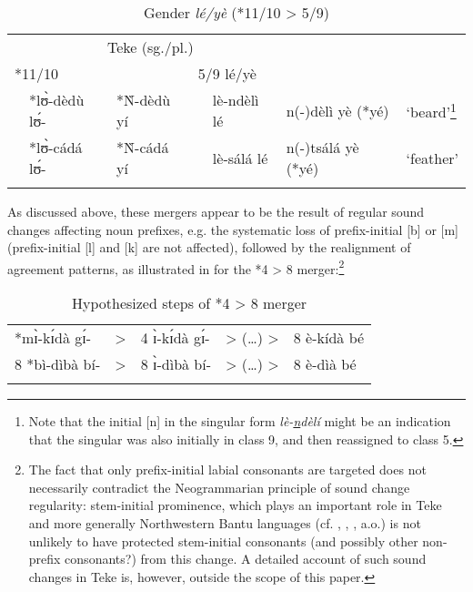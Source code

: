 \documentclass[output=paper,,modfonts,nonflat]{langsci/langscibook}
\begin{document}
\begin{table}[H]
\caption{Gender \textit{lé/yè} (*11/10 > 5/9)}
\label{table8}
\begin{small}
\begin{tabular}{l		l l l  		l		l		l}
  \lsptoprule
\multicolumn{3}{c}{PB (sg./pl.)}					&	\multicolumn{4}{c}{Teke (sg./pl.)}	\\	
\cmidrule(r){1-3}\cmidrule(l){4-7}
\multicolumn{2}{l}{*11/10}			&		&	\multicolumn{2}{l}{5/9 lé/yè}			&		&		\\	
	&	*lʊ̀-dèdù lʊ́-	&	*Ǹ-dèdù yí	&		&	lè-ndèlì lé	&	n(-)dèlì yè (*yé)	&	`beard’\footnote{Note that the initial [n] in the singular form \emph{lè-\underline{n}dèlí} might be an indication that the singular was also initially in class 9, and then reassigned to class 5.}	\\	
	&	*lʊ̀-cádá lʊ́-	&	*Ǹ-cádá yí	&		&	lè-sálá lé	&	n(-)tsálá yè (*yé)	&	`feather’	\\  
  \lspbottomrule
\end{tabular}
\end{small}
\end{table}
As discussed above, these mergers appear to be the result of regular sound changes affecting noun prefixes, e.g. the systematic loss of prefix-initial [b] or [m] (prefix-initial [l] and [k] are not affected), followed by the realignment of agreement patterns, as illustrated in  for the *4 > 8 merger:\footnote{The fact that only prefix-initial labial consonants are targeted does not necessarily contradict the Neogrammarian principle of sound change regularity: stem-initial prominence, which plays an important role in Teke and more generally Northwestern Bantu languages (cf. \cite{Paulian1975}, \cite{Hyman1987}, \cite{Idiatovvandevelde2016}, a.o.) is not unlikely to have protected stem-initial consonants (and possibly other non-prefix consonants?) from this change. A detailed account of such sound changes in Teke is, however, outside the scope of this paper.}


\begin{table}
\caption{Hypothesized steps of *4 > 8 merger}
\label{table9}
\begin{small}
\begin{tabular}[t]{lllll}
\lsptoprule	
4 *mɪ̀-kɪ́dà gɪ́-	&	> 	&	4  ɪ̀-kɪ́dà gɪ́-	&	> (…) > 	&	8  è-kídà bé 	\\
8 *bì-dìbà bí-	&	> 	&	8  ɪ̀-dìbà bí-	&	> (…) >	&	8  è-dìà bé	\\
  \lspbottomrule
\end{tabular}
\end{small}
\end{table}
\end{document}
